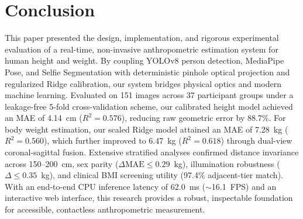 \documentclass[conference]{IEEEtran}
\begin{document}
\section{Conclusion}
This paper presented the design, implementation, and rigorous experimental evaluation of a real-time, non-invasive anthropometric estimation system for human height and weight. By coupling YOLOv8 person detection, MediaPipe Pose, and Selfie Segmentation with deterministic pinhole optical projection and regularized Ridge calibration, our system bridges physical optics and modern machine learning. Evaluated on 151 images across 37 participant groups under a leakage-free 5-fold cross-validation scheme, our calibrated height model achieved an MAE of 4.14~cm ($R^2=0.576$), reducing raw geometric error by 88.7\%. For body weight estimation, our scaled Ridge model attained an MAE of 7.28~kg ($R^2=0.560$), which further improved to 6.47~kg ($R^2=0.618$) through dual-view coronal-sagittal fusion. Extensive stratified analyses confirmed distance invariance across 150--200~cm, sex parity ($\Delta \text{MAE} \le 0.29$~kg), illumination robustness ($\Delta \le 0.35$~kg), and clinical BMI screening utility (97.4\% adjacent-tier match). With an end-to-end CPU inference latency of 62.0~ms ($\sim$16.1~FPS) and an interactive web interface, this research provides a robust, inspectable foundation for accessible, contactless anthropometric measurement.
\end{document}
